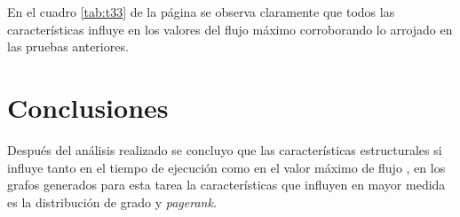\documentclass{article}
\begin{document}
En el cuadro \ref{tab:t33} de la página \pageref{tab:t33} se observa claramente que todos las características influye en los valores del flujo máximo corroborando lo arrojado en las pruebas anteriores.
\section{Conclusiones}

Después del análisis realizado se concluyo que las características estructurales si influye tanto en el tiempo de ejecución como en el valor máximo de flujo , en los grafos generados para esta tarea la características que influyen en mayor medida es la distribución de grado y \textit{pagerank}.

\newpage


\end{document}
